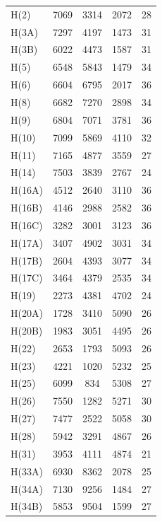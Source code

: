 \begin{center}
\tablelasttail{\bottomrule}
 {\footnotesize \singlespacing
\begin{supertabular}{lcccc}
H(2)&7069&3314&2072&28\\
H(3A)&7297&4197&1473&31\\
H(3B)&6022&4473&1587&31\\
H(5)&6548&5843&1479&34\\
H(6)&6604&6795&2017&36\\
H(8)&6682&7270&2898&34\\
H(9)&6804&7071&3781&36\\
H(10)&7099&5869&4110&32\\
H(11)&7165&4877&3559&27\\
H(14)&7503&3839&2767&24\\
H(16A)&4512&2640&3110&36\\
H(16B)&4146&2988&2582&36\\
H(16C)&3282&3001&3123&36\\
H(17A)&3407&4902&3031&34\\
H(17B)&2604&4393&3077&34\\
H(17C)&3464&4379&2535&34\\
H(19)&2273&4381&4702&24\\
H(20A)&1728&3410&5090&26\\
H(20B)&1983&3051&4495&26\\
H(22)&2653&1793&5093&26\\
H(23)&4221&1020&5232&25\\
H(25)&6099&834&5308&27\\
H(26)&7550&1282&5271&30\\
H(27)&7477&2522&5058&30\\
H(28)&5942&3291&4867&26\\
H(31)&3953&4111&4874&21\\
H(33A)&6930&8362&2078&25\\
H(34A)&7130&9256&1484&27\\
H(34B)&5853&9504&1599&27\\

\end{supertabular}}
\end{center}
